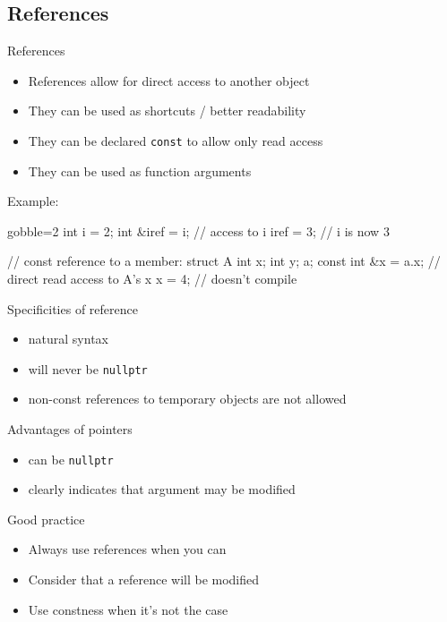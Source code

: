 \subsection[Refs]{References}

\begin{frame}[fragile]
  \begin{block}{References}
    \begin{itemize}
      \item References allow for direct access to another object
      \item They can be used as shortcuts / better readability
      \item They can be declared \texttt{const} to allow only read access
      \item They can be used as function arguments
    \end{itemize}
  \end{block}

  \begin{exampleblock}{Example:}
    \begin{cppcode*}{gobble=2}
      int i = 2;
      int &iref = i; // access to i
      iref = 3;      // i is now 3

      // const reference to a member:
      struct A { int x; int y; } a;
      const int &x = a.x; // direct read access to A's x
      x = 4;              // doesn't compile
    \end{cppcode*}
  \end{exampleblock}
\end{frame}

\begin{frame}[fragile]
  \begin{block}{Specificities of reference}
    \begin{itemize}
    \item natural syntax
    \item will never be \texttt{nullptr}
    \item non-const references to temporary objects are not allowed
    \end{itemize}
  \end{block}
  \begin{block}{Advantages of pointers}
    \begin{itemize}
    \item can be \texttt{nullptr}
    \item clearly indicates that argument may be modified
    \end{itemize}
  \end{block}
  \pause
  \begin{alertblock}{Good practice}
    \begin{itemize}
      \item Always use references when you can
      \item Consider that a reference will be modified
      \item Use constness when it's not the case
    \end{itemize}
  \end{alertblock}
\end{frame}


